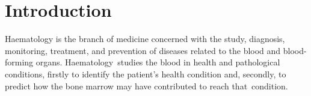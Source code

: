 \documentclass[sensors,review,accept,moreauthors,pdftex,10pt,a4paper]{mdpi}
\begin{document}


\section{Introduction}\label{s1}

Haematology is the branch of medicine concerned with the study, diagnosis, monitoring, treatment, and prevention of diseases related to the blood and blood-forming organs. Haematology~studies the blood in health and pathological conditions, firstly to identify the patient's health condition and, secondly, to predict how the bone marrow may have contributed to reach that~condition.
\end{document}
